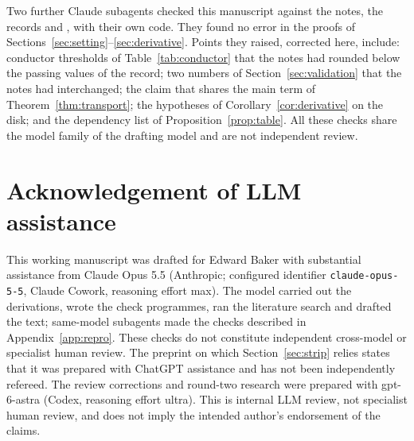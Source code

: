 \documentclass[11pt]{article}
\theoremstyle{definition}
\theoremstyle{remark}
\numberwithin{equation}{section}
\begin{document}
Two further Claude subagents checked this manuscript against the notes,
the records and \cite{hb}, with their own code. They found no error in the
proofs of Sections~\ref{sec:setting}--\ref{sec:derivative}. Points they
raised, corrected here, include: conductor thresholds of
Table~\ref{tab:conductor} that the notes had rounded below the passing
values of the record; two
numbers of Section~\ref{sec:validation} that the notes had interchanged;
the claim that \cite[Proposition~7]{hb} shares the main term of
Theorem~\ref{thm:transport}; the hypotheses of
Corollary~\ref{cor:derivative} on the disk; and the dependency list of
Proposition~\ref{prop:table}. All these checks share the model family of
the drafting model and are not independent review.

\section*{Acknowledgement of LLM assistance}
This working manuscript was drafted for Edward Baker with substantial
assistance from Claude Opus 5.5 (Anthropic; configured identifier
\texttt{claude-opus-5-5}, Claude Cowork, reasoning effort max). The model
carried out the derivations, wrote the check programmes, ran the
literature search and drafted the text; same-model subagents made the
checks described in Appendix~\ref{app:repro}. These checks do not
constitute independent cross-model or specialist human review. The
preprint \cite{hb} on which Section~\ref{sec:strip} relies states that it
was prepared with ChatGPT assistance and has not been independently
refereed. The review corrections and round-two research were prepared with
gpt-6-astra (Codex, reasoning effort ultra). This is internal LLM review, not specialist human review,
and does not imply the intended author's endorsement of the claims.
\end{document}
